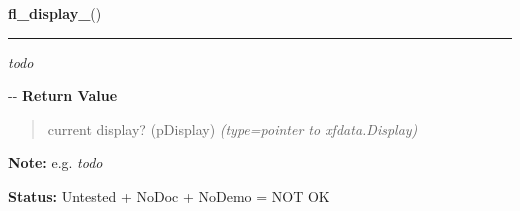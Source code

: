    \label{xformslib:flmisc:fl_display_}

    \vspace{0.5ex}

\hspace{.8\funcindent}\begin{boxedminipage}{\funcwidth}

    \raggedright \textbf{fl\_display\_}()

    \vspace{-1.5ex}

    \rule{\textwidth}{0.5\fboxrule}
\setlength{\parskip}{2ex}

\emph{todo}

-{}-
\setlength{\parskip}{1ex}
      \textbf{Return Value}
    \vspace{-1ex}

      \begin{quote}

current display? (pDisplay)
      {\it (type=pointer to xfdata.Display)}

      \end{quote}

\textbf{Note:} 
e.g. \emph{todo}


\textbf{Status:} 
Untested + NoDoc + NoDemo = NOT OK


    \end{boxedminipage}

